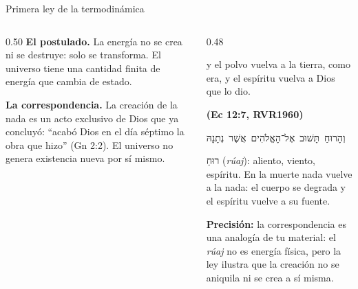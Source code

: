 \documentclass[hyperref={bookmarks=false},aspectratio=169]{beamer}
\newcommand{\heb}[1]{\mbox{\foreignlanguage{hebrew}{#1}}}
\newcommand{\fuente}[1]{\par\hfill{\upshape\bfseries\footnotesize\textcolor{azul}{#1}}}
\newcommand{\precision}[1]{{\footnotesize\color{gris}\textbf{Precisión:} #1}}
\begin{document}
\begin{frame}{Primera ley de la termodinámica}
\begin{columns}[t,onlytextwidth]
\begin{column}{0.50\textwidth}\small
\textbf{El postulado.} La energía no se crea ni se destruye: solo se transforma. El universo tiene una cantidad finita de energía que cambia de estado.\par\medskip
\textbf{La correspondencia.} La creación de la nada es un acto exclusivo de Dios que ya concluyó: ``acabó Dios en el día séptimo la obra que hizo'' (Gn 2:2). El universo no genera existencia nueva por sí mismo.
\end{column}
\begin{column}{0.48\textwidth}
\begin{cita}y el polvo vuelva a la tierra, como era, y el espíritu vuelva a Dios que lo dio.\fuente{(Ec 12:7, RVR1960)}\end{cita}
\begin{center}\heb{וְהָרוּחַ תָּשׁוּב אֶל־הָאֱלֹהִים אֲשֶׁר נְתָנָהּ}\end{center}
\scriptsize\heb{רוּחַ} (\emph{rúaj}): aliento, viento, espíritu. En la muerte nada vuelve a la nada: el cuerpo se degrada y el espíritu vuelve a su fuente.\par\smallskip
\precision{la correspondencia es una analogía de tu material: el \emph{rúaj} no es energía física, pero la ley ilustra que la creación no se aniquila ni se crea a sí misma.}
\end{column}
\end{columns}
\end{frame}
\end{document}
